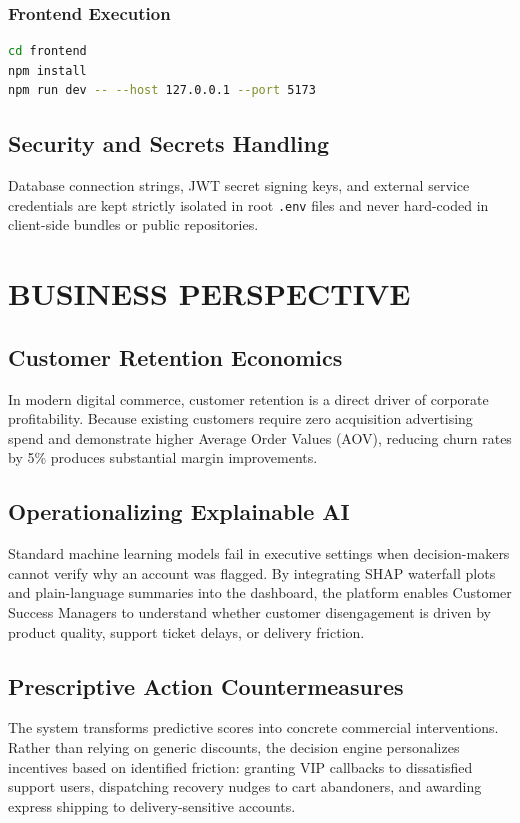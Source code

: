 \documentclass[12pt,a4paper]{article}
\begin{document}
\subsubsection{Frontend Execution}
\begin{lstlisting}[language=bash,caption={Starting the React Vite frontend application}]
cd frontend
npm install
npm run dev -- --host 127.0.0.1 --port 5173
\end{lstlisting}

\subsection{Security and Secrets Handling}\label{sub:8.3}
Database connection strings, JWT secret signing keys, and external service credentials are kept strictly isolated in root \texttt{.env} files and never hard-coded in client-side bundles or public repositories.

\newpage

\section{BUSINESS PERSPECTIVE}\label{chap:9}

\subsection{Customer Retention Economics}\label{sub:9.1}
In modern digital commerce, customer retention is a direct driver of corporate profitability. Because existing customers require zero acquisition advertising spend and demonstrate higher Average Order Values (AOV), reducing churn rates by 5\% produces substantial margin improvements.

\subsection{Operationalizing Explainable AI}\label{sub:9.2}
Standard machine learning models fail in executive settings when decision-makers cannot verify why an account was flagged. By integrating SHAP waterfall plots and plain-language summaries into the dashboard, the platform enables Customer Success Managers to understand whether customer disengagement is driven by product quality, support ticket delays, or delivery friction.

\subsection{Prescriptive Action Countermeasures}\label{sub:9.3}
The system transforms predictive scores into concrete commercial interventions. Rather than relying on generic discounts, the decision engine personalizes incentives based on identified friction: granting VIP callbacks to dissatisfied support users, dispatching recovery nudges to cart abandoners, and awarding express shipping to delivery-sensitive accounts.
\end{document}
